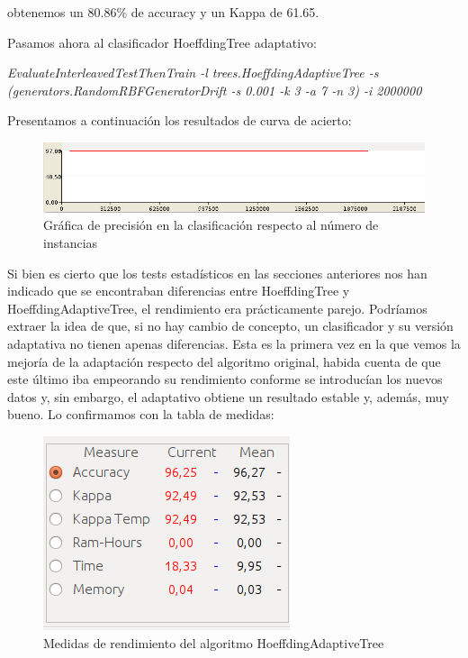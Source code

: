obtenemos un 80.86\% de accuracy y un Kappa de 61.65.

Pasamos ahora al clasificador HoeffdingTree adaptativo:

\textit{EvaluateInterleavedTestThenTrain -l trees.HoeffdingAdaptiveTree -s (generators.RandomRBFGeneratorDrift -s 0.001 -k 3 -a 7 -n 3) -i 2000000}

Presentamos a continuación los resultados de curva de acierto:

\begin{figure}[H] %
	\centering
	\includegraphics[scale=0.4]{cd3.png}  %
	\caption{Gráfica de precisión en la clasificación respecto al número de instancias} 
	\label{fig:cd3}
\end{figure}

Si bien es cierto que los tests estadísticos en las secciones anteriores nos han indicado que se encontraban diferencias entre HoeffdingTree y HoeffdingAdaptiveTree, el rendimiento era prácticamente parejo. Podríamos extraer la idea de que, si no hay cambio de concepto, un clasificador y su versión adaptativa no tienen apenas diferencias. Esta es la primera vez en la que vemos la mejoría de la adaptación respecto del algoritmo original, habida cuenta de que este último iba empeorando su rendimiento conforme se introducían los nuevos datos y, sin embargo, el adaptativo obtiene un resultado estable y, además, muy bueno. Lo confirmamos con la tabla de medidas:

\begin{figure}[H] %
	\centering
	\includegraphics[scale=0.4]{cd4.png}  %
	\caption{Medidas de rendimiento del algoritmo HoeffdingAdaptiveTree} 
	\label{fig:cd4}
\end{figure}

